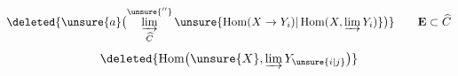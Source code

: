 \[
 \deleted{\unsure{a}\bigl(\varinjlim_{\widehat C}^{\unsure{''}}\unsure{\operatorname{Hom}(X\to Y_i)|\operatorname{Hom}(X,\varinjlim Y_i)}\bigr)}
 \qquad \mathbf E\subset\widehat C
\]
\[
 \deleted{\operatorname{Hom}\bigl(\unsure{X},\varinjlim Y_{\unsure{i|j}}\bigr)}
\]
